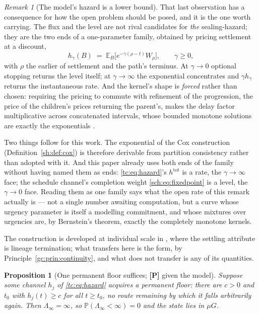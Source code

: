 \documentclass[11pt]{article}
\numberwithin{equation}{section}
\theoremstyle{plain}
\newtheorem{proposition}[theorem]{Proposition}
\theoremstyle{definition}
\theoremstyle{remark}
\newtheorem{remark}[theorem]{Remark}
\newcommand{\E}{\mathbb{E}}
\newcommand{\PP}{\mathbb{P}}
\begin{document}
\begin{remark}[The model's hazard is a lower bound]
That last observation has a consequence for how the open problem should
be posed, and it is the one worth carrying. The flux and the level are
not rival candidates for \emph{the} sealing-hazard; they are the two ends
of a one-parameter family, obtained by pricing settlement at a discount,
\begin{equation}\label{gc:eq:sealprice}
h_\gamma(B)\;=\;\E_B\bigl[e^{-\gamma(\rho-t)}W_\rho\bigr],
\qquad \gamma\ge0,
\end{equation}
with $\rho$ the earlier of settlement and the path's terminus. At
$\gamma\to0$ optional stopping returns the level itself; at
$\gamma\to\infty$ the exponential concentrates and $\gamma h_\gamma$
returns the instantaneous rate. And the kernel's shape is \emph{forced}
rather than chosen: requiring the pricing to commute with refinement of
the progression, the price of the children's prices returning the
parent's, makes the delay factor multiplicative across concatenated
intervals, whose bounded monotone solutions are exactly the exponentials
\cite{Aethus}.

Two things follow for this work. The exponential of the Cox construction
(Definition~\ref{sh:def:cox}) is therefore derivable from partition consistency
rather than adopted with it. And this paper already uses both ends of the
family without having named them as ends: \eqref{tc:eq:hazard}'s
$h^{\mathrm{tot}}$ is a rate, the $\gamma\to\infty$ face; the schedule
channel's completion weight \eqref{sch:eq:fixedpoint} is a level, the
$\gamma\to0$ face. Reading them as one family says what the open rate of
this remark actually is --- not a single number awaiting computation, but
a curve whose urgency parameter is itself a modelling commitment, and
whose mixtures over urgencies are, by Bernstein's theorem, exactly the
completely monotone kernels.

The construction is developed at individual scale in \cite{Aethus}, where
the settling attribute is lineage termination; what transfers here is the
form, by Principle~\ref{gc:prin:continuity}, and what does not transfer
is any of its quantities.
\end{remark}

\begin{proposition}[One permanent floor suffices; \textbf{[P]} given the
model]\label{gc:prop:onefloor}
Suppose some channel $h_j$ of \eqref{tc:eq:hazard} acquires a
\emph{permanent floor}: there are $c>0$ and $t_0$ with
$h_j(t)\ge c$ for all $t\ge t_0$, no route remaining by which it falls
arbitrarily again. Then $\Lambda_\infty=\infty$, so
$\PP(\Lambda_\infty<\infty)=0$ and the state lies in $\mu G$.
\end{proposition}
\end{document}
